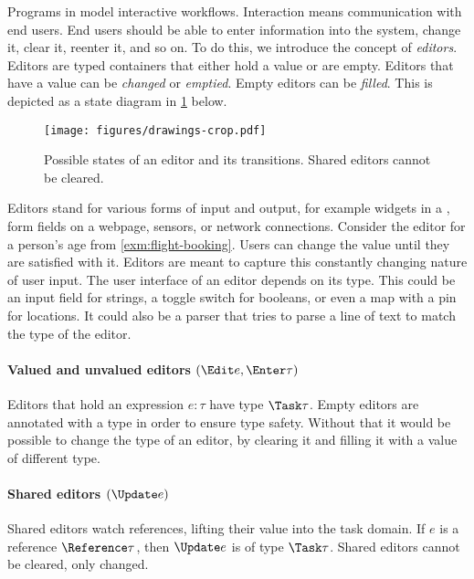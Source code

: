 Programs in \TOPHAT model interactive workflows.
Interaction means communication with end users.
End users should be able to enter information into the system, change it, clear it, reenter it, and so on.
To do this, we introduce the concept of \emph{editors}.
%
Editors are typed containers that either hold a value or are empty.
Editors that have a value can be \emph{changed} or \emph{emptied}.
Empty editors can be \emph{filled}.
This is depicted as a state diagram in \cref{fig:editor-state} below.

\begin{figure}[h]
  \centering
  \texttt{[image: figures/drawings-crop.pdf]}
  \caption{
    Possible states of an editor and its transitions.
    Shared editors cannot be cleared.
  }
  \label{fig:editor-state}
\end{figure}

Editors stand for various forms of input and output, for example widgets in a \GUI, form fields on a webpage, sensors, or network connections.
%
Consider the editor for a person's age from \cref{exm:flight-booking}.
Users can change the value until they are satisfied with it.
Editors are meant to capture this constantly changing nature of user input.
%
The user interface of an editor depends on its type.
This could be an input field for strings, a toggle switch for booleans, or even a map with a pin for locations.
It could also be a parser that tries to parse a line of text to match the type of the editor.


\paragraph{Valued and unvalued editors $(\Edit e, \Enter \tau)$}

Editors that hold an expression $e : \tau$ have type $\Task \tau$.
Empty editors are annotated with a type in order to ensure type safety.
Without that it would be possible to change the type of an editor, by clearing it and filling it with a value of different type.

\paragraph{Shared editors $(\Update e)$}

Shared editors watch references, lifting their value into the task domain.
If $e$ is a reference $\Reference \tau$, then $\Update e$ is of type $\Task \tau$.
Shared editors cannot be cleared, only changed.

